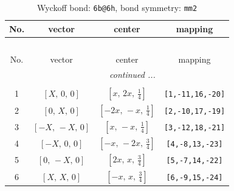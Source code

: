 \documentclass[fleqn,8pt]{jsarticle}
\begin{document}
\begin{longtable}{cccc}
\caption{Wyckoff bond: {\tt 6b@6h}, bond symmetry: {\tt mm2}}
 \\
 \hline \hline
No. & vector & center & mapping \\ \hline \endfirsthead

\multicolumn{3}{l}{\tablename\ \thetable{}} \\
 \hline \hline
No. & vector & center & mapping \\ \hline \endhead

 \hline \hline
\multicolumn{3}{r}{\footnotesize\it continued ...} \\ \endfoot

 \hline \hline
\multicolumn{3}{r}{} \\ \endlastfoot

1 & $\left[ X,\, 0,\, 0 \right]$ & $\left[ x,\, 2 x,\, \frac{1}{4} \right]$ & {\tt [1,-11,16,-20]} \\ \hline
2 & $\left[ 0,\, X,\, 0 \right]$ & $\left[ - 2 x,\, - x,\, \frac{1}{4} \right]$ & {\tt [2,-10,17,-19]} \\ \hline
3 & $\left[ - X,\, - X,\, 0 \right]$ & $\left[ x,\, - x,\, \frac{1}{4} \right]$ & {\tt [3,-12,18,-21]} \\ \hline
4 & $\left[ - X,\, 0,\, 0 \right]$ & $\left[ - x,\, - 2 x,\, \frac{3}{4} \right]$ & {\tt [4,-8,13,-23]} \\ \hline
5 & $\left[ 0,\, - X,\, 0 \right]$ & $\left[ 2 x,\, x,\, \frac{3}{4} \right]$ & {\tt [5,-7,14,-22]} \\ \hline
6 & $\left[ X,\, X,\, 0 \right]$ & $\left[ - x,\, x,\, \frac{3}{4} \right]$ & {\tt [6,-9,15,-24]} \\
\end{longtable}
\renewcommand{\arraystretch}{1.2}
\end{document}
